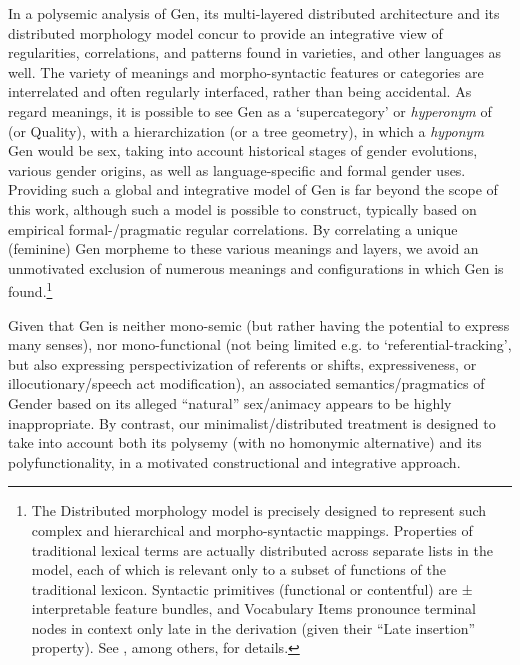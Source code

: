 In a polysemic analysis of Gen, its multi-layered distributed architecture and
its distributed morphology model concur to provide an integrative view of
regularities, correlations, and patterns found in  varieties, and other
languages as well. The variety of meanings and morpho-syntactic features or
categories are interrelated and often regularly interfaced, rather than being
accidental. As regard meanings, it is possible to see Gen as a 
`supercategory' or \textit{hyperonym} of  (or Quality), with a
hierarchization (or a tree geometry), in which a \textit{hyponym} Gen would be
sex, taking into account historical stages of gender evolutions, various gender
origins, as well as language-specific  and formal gender uses. Providing
such a global and integrative model of Gen is far beyond the scope of this
work, although such a model is possible to construct, typically based on
empirical formal-/pragmatic regular correlations. By correlating a
unique (feminine) Gen morpheme to these various meanings and layers, we avoid
an unmotivated exclusion of numerous meanings and configurations in which Gen
is found.\footnote{The Distributed morphology model is precisely designed to
represent such complex and hierarchical  and morpho-syntactic mappings.
Properties of traditional lexical terms are actually distributed across
separate lists in the model, each of which is relevant only to a subset of
functions of the traditional lexicon. Syntactic primitives (functional or
contentful) are ± interpretable feature bundles, and Vocabulary Items pronounce
terminal nodes in context only late in the derivation (given their ``Late
insertion'' property). See \citet{HalleEtAl1993,Harley2014}, among others, for
details.}

Given that Gen is neither mono-semic (but rather having the potential to
express many senses), nor mono-functional (not being limited e.g. to
`referential-tracking', but also expressing perspectivization of referents or
shifts, expressiveness, or illocutionary/speech act modification), an
associated semantics/pragmatics of Gender based on its alleged ``natural''
sex/animacy appears to be highly inappropriate. By contrast, our
minimalist/distributed treatment is designed to take into account both its
polysemy (with no homonymic alternative) and its polyfunctionality, in a
motivated constructional and integrative approach.

